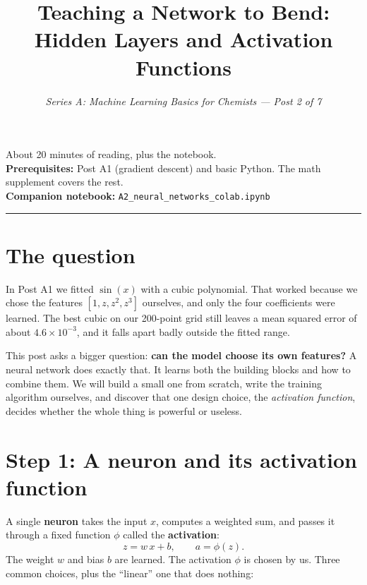 \documentclass[11pt]{article}
\title{\textbf{Teaching a Network to Bend:}\\[0.2em]
       Hidden Layers and Activation Functions}
\author{\textit{Series A: Machine Learning Basics for Chemists --- Post 2 of 7}}
\date{}
\newcommand{\colaburl}{https://colab.research.google.com/github/YOUR-USER/YOUR-REPO/blob/main/notebooks/A2_neural_networks_colab.ipynb}
\newcommand{\colabbutton}{%
  \href{\colaburl}{\tcbox[on line,colback=orange!15,colframe=orange!70!black,boxrule=0.6pt,arc=3pt,
    left=4pt,right=4pt,top=1pt,bottom=1pt]{\small\textbf{$\blacktriangleright$ Open in Google Colab}}}}
\begin{document}
\maketitle
\thispagestyle{empty}

\begin{center}
\small
About 20 minutes of reading, plus the notebook.\\
\textbf{Prerequisites:} Post A1 (gradient descent) and basic Python. The math supplement covers the rest.\\
\textbf{Companion notebook:} \texttt{A2\_neural\_networks\_colab.ipynb}\\[0.4em]
\colabbutton{}
\end{center}

\vspace{0.5em}
\hrule
\vspace{0.5em}

\section{The question}
In Post A1 we fitted $\sin(x)$ with a cubic polynomial. That worked because we chose the features $[1,z,z^2,z^3]$ ourselves, and only the four coefficients were learned. The best cubic on our 200-point grid still leaves a mean squared error of about $4.6\times10^{-3}$, and it falls apart badly outside the fitted range.

This post asks a bigger question: \textbf{can the model choose its own features?} A neural network does exactly that. It learns both the building blocks and how to combine them. We will build a small one from scratch, write the training algorithm ourselves, and discover that one design choice, the \emph{activation function}, decides whether the whole thing is powerful or useless.

\section{Step 1: A neuron and its activation function}
A single \textbf{neuron} takes the input $x$, computes a weighted sum, and passes it through a fixed function $\phi$ called the \textbf{activation}:
\begin{equation}
  z = w\,x + b, \qquad a = \phi(z).
\end{equation}
The weight $w$ and bias $b$ are learned. The activation $\phi$ is chosen by us. Three common choices, plus the ``linear'' one that does nothing:
\end{document}
